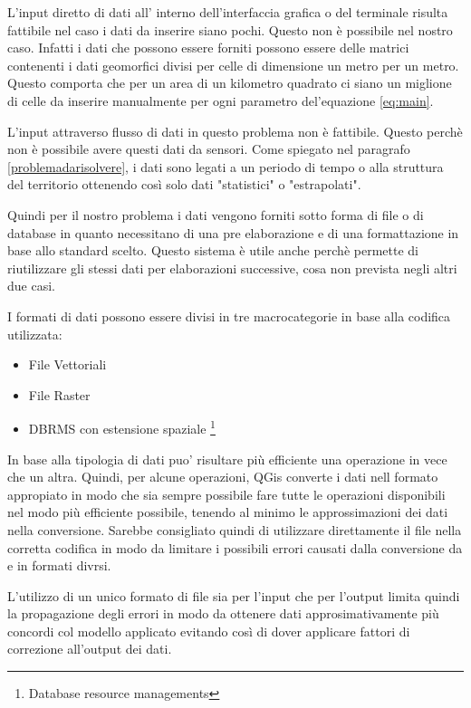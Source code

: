 L'input diretto di dati all' interno dell'interfaccia grafica o del terminale risulta fattibile nel caso i dati da inserire siano pochi. Questo non è possibile nel nostro caso. Infatti i dati che possono essere forniti possono essere delle matrici contenenti i dati geomorfici divisi per celle di dimensione un metro per un metro. Questo comporta che per un area di un kilometro quadrato ci siano un miglione di celle da inserire manualmente per ogni parametro del'equazione \eqref{eq:main}.

L'input attraverso flusso di dati in questo problema non è fattibile. Questo perchè non è possibile avere questi dati da sensori. Come spiegato nel paragrafo \ref{problemadarisolvere}, i dati sono legati a un periodo di tempo o alla struttura del territorio ottenendo così solo dati "statistici" o "estrapolati".

Quindi per il nostro problema i dati vengono forniti sotto forma di file o di database in quanto necessitano di una pre elaborazione e di una formattazione in base allo standard scelto.
Questo sistema è utile anche perchè permette di riutilizzare gli stessi dati per elaborazioni successive, cosa non prevista negli altri due casi.

I formati di dati possono essere divisi in tre macrocategorie in base alla codifica utilizzata:
\begin{itemize}
	\item File Vettoriali
	\item File Raster
	\item DBRMS con estensione spaziale \footnote{Database resource managements}
\end{itemize}

In base alla tipologia di dati puo' risultare più efficiente una operazione in vece che un altra.
Quindi, per alcune operazioni, QGis converte i dati nell formato appropiato in modo che sia sempre possibile fare tutte le operazioni disponibili nel modo più efficiente possibile, tenendo al minimo le approssimazioni dei dati nella conversione. Sarebbe consigliato quindi di utilizzare direttamente il file nella corretta codifica in modo da limitare i possibili errori causati dalla conversione da e in formati divrsi.

L'utilizzo di un unico formato di file sia per l'input che per l'output limita quindi la propagazione degli errori in modo da ottenere dati approsimativamente più concordi col modello applicato evitando così di dover applicare fattori di correzione all'output dei dati.

